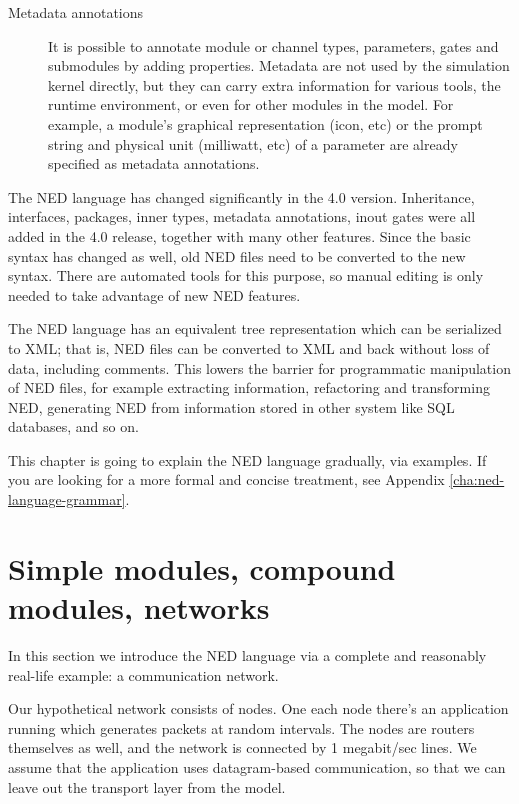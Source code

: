 \begin{description}
\item[Metadata annotations] It is possible to annotate module or channel
types, parameters, gates and submodules by adding properties. Metadata are
not used by the simulation kernel directly, but they can carry extra
information for various tools, the runtime environment, or even for other
modules in the model. For example, a module's graphical representation
(icon, etc)  or the prompt string and physical unit (milliwatt, etc) of a
parameter are already specified as metadata annotations.

\end{description}

\begin{note}
    The NED language has changed significantly in the 4.0 version.
    Inheritance, interfaces, packages, inner types, metadata annotations, inout
    gates were all added in the 4.0 release, together with many other features.
    Since the basic syntax has changed as well, old NED files need to be
    converted to the new syntax. There are automated tools for this purpose, so
    manual editing is only needed to take advantage of new NED features.
\end{note}

The NED language has an equivalent tree representation which can be
serialized to XML; that is, NED files can be converted to XML and back
without loss of data, including comments. This lowers the barrier for
programmatic manipulation of NED files, for example extracting information,
refactoring and transforming NED, generating NED from information stored in
other system like SQL databases, and so on.

\begin{note}
    This chapter is going to explain the NED language gradually, via examples.
    If you are looking for a more formal and concise treatment, see
    Appendix \ref{cha:ned-language-grammar}.
\end{note}


\section{Simple modules, compound modules, networks}

In this section we introduce the NED language via a complete and
reasonably real-life example: a communication network.

Our hypothetical network consists of nodes. One each node there's an
application running which generates packets at random intervals.
The nodes are routers themselves as well, and the network is connected
by 1 megabit/sec lines. We assume that the application uses datagram-based
communication, so that we can leave out the transport layer from the model.

